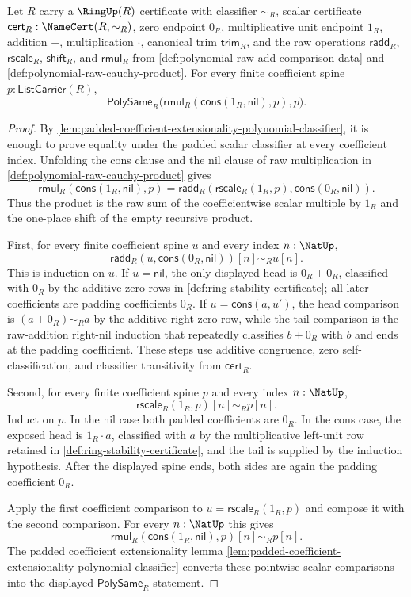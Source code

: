 \begin{theorem}
\label{thm:polynomial-raw-multiplication-singleton-one-left-identity}
Let $R$ carry a $\RingUp(R)$ certificate with classifier $\sim_R$, scalar certificate $\mathsf{cert}_R:\NameCert(R,\sim_R)$, zero endpoint $0_R$, multiplicative unit endpoint $1_R$, addition $+$, multiplication $\cdot$, canonical trim $\mathsf{trim}_R$, and the raw operations $\mathsf{radd}_R$, $\mathsf{rscale}_R$, $\mathsf{shift}_R$, and $\mathsf{rmul}_R$ from \autoref{def:polynomial-raw-add-comparison-data} and \autoref{def:polynomial-raw-cauchy-product}. For every finite coefficient spine $p:\mathsf{ListCarrier}(R)$,
$$
\mathsf{PolySame}_R\bigl(\mathsf{rmul}_R(\mathsf{cons}(1_R,\mathsf{nil}),p),p\bigr).
$$
\end{theorem}
\begin{proof}
By \autoref{lem:padded-coefficient-extensionality-polynomial-classifier}, it is enough to prove equality under the padded scalar classifier at every coefficient index. Unfolding the cons clause and the nil clause of raw multiplication in \autoref{def:polynomial-raw-cauchy-product} gives
$$
\mathsf{rmul}_R(\mathsf{cons}(1_R,\mathsf{nil}),p)
=
\mathsf{radd}_R(\mathsf{rscale}_R(1_R,p),\mathsf{cons}(0_R,\mathsf{nil})).
$$
Thus the product is the raw sum of the coefficientwise scalar multiple by $1_R$ and the one-place shift of the empty recursive product.

First, for every finite coefficient spine $u$ and every index $n:\NatUp$,
$$
\mathsf{radd}_R(u,\mathsf{cons}(0_R,\mathsf{nil}))[n]\sim_Ru[n].
$$
This is induction on $u$. If $u=\mathsf{nil}$, the only displayed head is $0_R+0_R$, classified with $0_R$ by the additive zero rows in \autoref{def:ring-stability-certificate}; all later coefficients are padding coefficients $0_R$. If $u=\mathsf{cons}(a,u')$, the head comparison is $(a+0_R)\sim_Ra$ by the additive right-zero row, while the tail comparison is the raw-addition right-nil induction that repeatedly classifies $b+0_R$ with $b$ and ends at the padding coefficient. These steps use additive congruence, zero self-classification, and classifier transitivity from $\mathsf{cert}_R$.

Second, for every finite coefficient spine $p$ and every index $n:\NatUp$,
$$
\mathsf{rscale}_R(1_R,p)[n]\sim_Rp[n].
$$
Induct on $p$. In the nil case both padded coefficients are $0_R$. In the cons case, the exposed head is $1_R\cdot a$, classified with $a$ by the multiplicative left-unit row retained in \autoref{def:ring-stability-certificate}, and the tail is supplied by the induction hypothesis. After the displayed spine ends, both sides are again the padding coefficient $0_R$.

Apply the first coefficient comparison to $u=\mathsf{rscale}_R(1_R,p)$ and compose it with the second comparison. For every $n:\NatUp$ this gives
$$
\mathsf{rmul}_R(\mathsf{cons}(1_R,\mathsf{nil}),p)[n]
\sim_R
p[n].
$$
The padded coefficient extensionality lemma \autoref{lem:padded-coefficient-extensionality-polynomial-classifier} converts these pointwise scalar comparisons into the displayed $\mathsf{PolySame}_R$ statement.
\end{proof}

